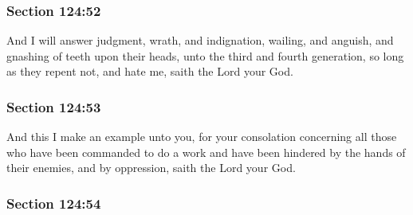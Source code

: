 
	\subsubsection{Section 124:52} %
		\label{DC124-52}

		And I will answer judgment, wrath, and indignation, wailing, and anguish, and gnashing of teeth upon their heads, unto the third and fourth generation, so long as they repent not, and hate me, saith the Lord your God.


	\subsubsection{Section 124:53} %
		\label{DC124-53}

		And this I make an example unto you, for your consolation concerning all those who have been commanded to do a work and have been hindered by the hands of their enemies, and by oppression, saith the Lord your God.


	\subsubsection{Section 124:54} %
		\label{DC124-54}

